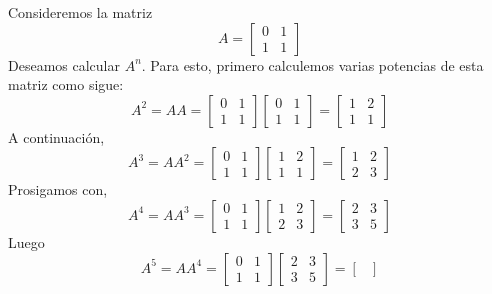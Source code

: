 \begin{example}
    Consideremos la matriz
    $$A = \begin{bmatrix}
        0 & 1 \\
        1 & 1
    \end{bmatrix}$$
    Deseamos calcular $A^n$. Para esto, primero calculemos varias potencias de esta matriz como sigue:
    $$A^2 = AA = \begin{bmatrix}
        0 & 1 \\
        1 & 1
    \end{bmatrix} \begin{bmatrix}
        0 & 1 \\
        1 & 1
    \end{bmatrix} = \begin{bmatrix}
        1 & 2 \\
        1 & 1
    \end{bmatrix}$$
    A continuación,
    $$A^3 = AA^2 = \begin{bmatrix}
        0 & 1 \\
        1 & 1
    \end{bmatrix}\begin{bmatrix}
        1 & 2 \\
        1 & 1
    \end{bmatrix} = \begin{bmatrix}
        1 & 2 \\
        2 & 3
    \end{bmatrix}$$
    Prosigamos con,
    $$A^4 = AA^3 = \begin{bmatrix}
        0 & 1 \\
        1 & 1
    \end{bmatrix}\begin{bmatrix}
        1 & 2 \\
        2 & 3
    \end{bmatrix} = \begin{bmatrix}
        2 & 3 \\
        3 & 5
    \end{bmatrix}$$
    Luego
    $$A^5 = AA^4 = \begin{bmatrix}
        0 & 1 \\
        1 & 1
    \end{bmatrix}\begin{bmatrix}
        2 & 3 \\
        3 & 5
    \end{bmatrix} = \begin{bmatrix}

\end{bmatrix}$$
\end{example}

